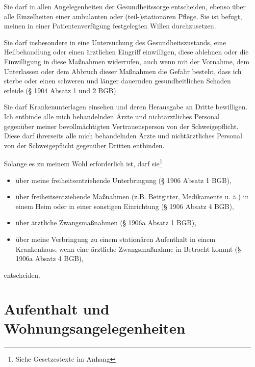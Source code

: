 \documentclass[pdftex,12pt,a4paper]{article}
\begin{document}
Sie darf in allen Angelegenheiten der Gesundheitssorge entscheiden, ebenso über
alle Einzelheiten einer ambulanten oder (teil-)stationären Pflege. Sie ist befugt,
meinen
in einer Patientenverfügung festgelegten Willen durchzusetzen.

 
 
Sie darf insbesondere in eine Untersuchung des Gesundheitszustands, eine
Heilbehandlung
oder einen ärztlichen Eingriff einwilligen, diese ablehnen oder die
Einwilligung in diese Maßnahmen widerrufen, auch wenn mit der Vornahme, dem
Unterlassen oder dem Abbruch dieser Maßnahmen die Gefahr besteht, dass ich
sterbe
oder einen schweren und länger dauernden gesundheitlichen Schaden erleide
(§ 1904 Absatz 1 und 2 BGB).

 
 
Sie darf Krankenunterlagen einsehen und deren Herausgabe an Dritte bewilligen.
Ich entbinde alle mich behandelnden Ärzte und nichtärztliches Personal gegenüber
meiner bevollmächtigten Vertrauensperson von der Schweigepflicht. Diese darf ihrerseits
alle mich behandelnden Ärzte und nichtärztliches Personal von der Schweigepflicht
gegenüber Dritten entbinden.

 
 
Solange es zu meinem Wohl erforderlich ist, darf sie\footnote{Siehe Gesetzestexte im Anhang}

\begin{itemize}

\item über meine freiheitsentziehende Unterbringung (§ 1906 Absatz 1 BGB), 

\item über freiheitsentziehende Maßnahmen (z.B. Bettgitter, Medikamente u. ä.) in einem Heim oder in einer sonstigen Einrichtung (§ 1906 Absatz 4 BGB),

\item über ärztliche Zwangsmaßnahmen (§ 1906a Absatz 1 BGB),

\item über meine Verbringung zu einem stationären Aufenthalt in einem Krankenhaus, wenn eine ärztliche Zwangsmaßnahme in Betracht kommt (§ 1906a Absatz 4 BGB), 


\end{itemize}

entscheiden.

\section{Aufenthalt und Wohnungsangelegenheiten} 
\end{document}
